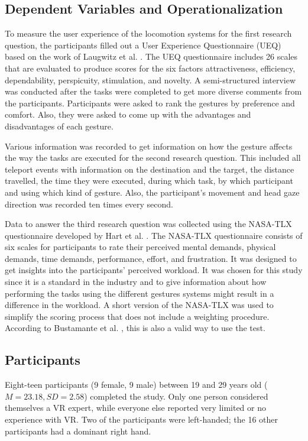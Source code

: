 \subsection{Dependent Variables and Operationalization}
To measure the user experience of the locomotion systems for the first research question, the participants filled out a User Experience Questionnaire (UEQ) based on the work of Laugwitz et al. \cite{Laugwitz2008}. The UEQ questionnaire includes 26 scales that are evaluated to produce scores for the six factors attractiveness, efficiency, dependability, perspicuity, stimulation, and novelty. 
A semi-structured interview was conducted after the tasks were completed to get more diverse comments from the participants. Participants were asked to rank the gestures by preference and comfort. Also, they were asked to come up with the advantages and disadvantages of each gesture.

Various information was recorded to get information on how the gesture affects the way the tasks are executed for the second research question. This included all teleport events with information on the destination and the target, the distance travelled, the time they were executed, during which task, by which participant and using which kind of gesture. Also, the participant's movement and head gaze direction was recorded ten times every second.  

Data to answer the third research question was collected using the NASA-TLX questionnaire developed by Hart et al. \cite{Hart1988}.
The NASA-TLX questionnaire consists of six scales for participants to rate their perceived mental demands, physical demands, time demands, performance, effort, and frustration. It was designed to get insights into the participants' perceived workload. It was chosen for this study since it is a standard in the industry and to give information about how performing the tasks using the different gestures systems might result in a difference in the workload. A short version of the NASA-TLX was used to simplify the scoring process that does not include a weighting procedure. According to Bustamante et al. \cite{Bustamante2008}, this is also a valid way to use the test.

\subsection{Participants}
Eight-teen participants (9 female, 9 male) between 19 and 29 years old ($M=23.18,SD=2.58$) completed the study. Only one person considered themselves a VR expert, while everyone else reported very limited or no experience with VR. Two of the participants were left-handed; the 16 other participants had a dominant right hand. 


